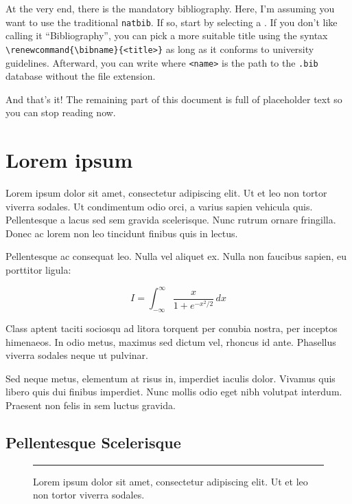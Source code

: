 \documentclass[dissertation]{msudissertation}
\begin{document}
At the very end, there is the mandatory bibliography.  Here, I'm assuming you want to use the traditional \texttt{natbib}.  If so, start by selecting a \verb||.  If you don't like calling it ``Bibliography'', you can pick a more suitable title using the syntax \verb|\renewcommand{\bibname}{<title>}| as long as it conforms to university guidelines.  Afterward, you can write \verb|| where \texttt{<name>} is the path to the \texttt{.bib} database without the file extension.

And that's it!  The remaining part of this document is full of placeholder text so you can stop reading now.

\chapter{Lorem ipsum}

Lorem ipsum dolor sit amet, consectetur adipiscing elit. Ut et leo non tortor viverra sodales. Ut condimentum odio orci, a varius sapien vehicula quis. Pellentesque a lacus sed sem gravida scelerisque. Nunc rutrum ornare fringilla. Donec ac lorem non leo tincidunt finibus quis in lectus.\cite{exampleref1}

Pellentesque ac consequat leo. Nulla vel aliquet ex. Nulla non faucibus sapien, eu porttitor ligula:

\begin{equation}
  I = \int_{-\infty}^\infty \frac{x}{1 + e^{-x^2 / 2}} \, d x
\end{equation}

Class aptent taciti sociosqu ad litora torquent per conubia nostra, per inceptos himenaeos. In odio metus, maximus sed dictum vel, rhoncus id ante. Phasellus viverra sodales neque ut pulvinar.

Sed neque metus, elementum at risus in, imperdiet iaculis dolor. Vivamus quis libero quis dui finibus imperdiet. Nunc mollis odio eget nibh volutpat interdum. Praesent non felis in sem luctus gravida.

\section{Pellentesque Scelerisque}

\begin{figure}
  \centering
  \rule{6cm}{4cm}
  \caption{Lorem ipsum dolor sit amet, consectetur adipiscing elit. Ut et leo non tortor viverra sodales.}
\end{figure}
\end{document}

